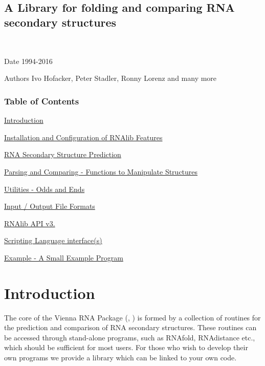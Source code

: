 ~\newline
 

\subsection*{A Library for folding and comparing R\+NA secondary structures}



~\newline
 \begin{DoxyDate}{Date}
1994-\/2016 
\end{DoxyDate}
\begin{DoxyAuthor}{Authors}
Ivo Hofacker, Peter Stadler, Ronny Lorenz and many more
\end{DoxyAuthor}
\subsubsection*{Table of Contents}





\begin{DoxyItemize}
\item \hyperlink{index_mp_intro}{Introduction} \item \hyperlink{install}{Installation and Configuration of R\+N\+Alib Features} \item \hyperlink{group__folding__routines}{R\+NA Secondary Structure Prediction} \item \hyperlink{mp_parse}{Parsing and Comparing -\/ Functions to Manipulate Structures} \item \hyperlink{mp_utils}{Utilities -\/ Odds and Ends} \item \hyperlink{file_formats}{Input / Output File Formats} \item \hyperlink{newAPI}{R\+N\+Alib A\+PI v3.} \item \hyperlink{scripting}{Scripting Language interface(s)} \item \hyperlink{mp_example}{Example -\/ A Small Example Program}\end{DoxyItemize}


\hypertarget{index_mp_intro}{}\section{Introduction}\label{index_mp_intro}
The core of the Vienna R\+NA Package (\cite{lorenz:2011}, \cite{hofacker:1994}) is formed by a collection of routines for the prediction and comparison of R\+NA secondary structures. These routines can be accessed through stand-\/alone programs, such as R\+N\+Afold, R\+N\+Adistance etc., which should be sufficient for most users. For those who wish to develop their own programs we provide a library which can be linked to your own code.

